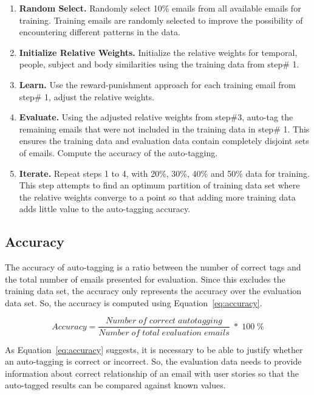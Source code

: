 \begin{enumerate}
	\item \textbf{Random Select.} Randomly select 10\% emails from all available emails for training. Training emails are randomly selected to improve the possibility of encountering different patterns in the data.
	\item \textbf{Initialize Relative Weights.} Initialize the relative weights for temporal, people, subject and body similarities using the training data from step\# 1.
	\item \textbf{Learn.} Use the reward-punishment approach for each training email from step\# 1, adjust the relative weights.
	\item \textbf{Evaluate.} Using the adjusted relative weights from step\#3, auto-tag the remaining emails that were not included in the training data in step\# 1. This ensures the training data and evaluation data contain completely disjoint sets of emails. Compute the accuracy of the auto-tagging.
	\item \textbf{Iterate.} Repeat steps 1 to 4, with 20\%, 30\%, 40\% and 50\% data for training. This step attempts to find an optimum partition of  training data set where the relative weights converge to a point so that adding more training data adds little value to the auto-tagging accuracy.
	
\end{enumerate}

\subsection{Accuracy}
The accuracy of auto-tagging is a ratio between the number of correct tags and the total number of emails presented for evaluation. Since this excludes the training data set, the accuracy only represents the accuracy over the evaluation data set. So, the accuracy is computed using Equation~\ref{eq:accuracy}.
	
\begin{equation}
\label{eq:accuracy}
Accuracy = \frac{Number \;  of  \; correct  \; auto tagging} {Number \;  of \;  total \;  evaluation \;  emails }  \; *  \; 100  \; \%
\end{equation}
	
As Equation~\ref{eq:accuracy} suggests, it is necessary to be able to justify whether an auto-tagging is correct or incorrect. So, the evaluation data needs to provide information about correct relationship of an email with user stories so that the auto-tagged results can be compared against  known values.

